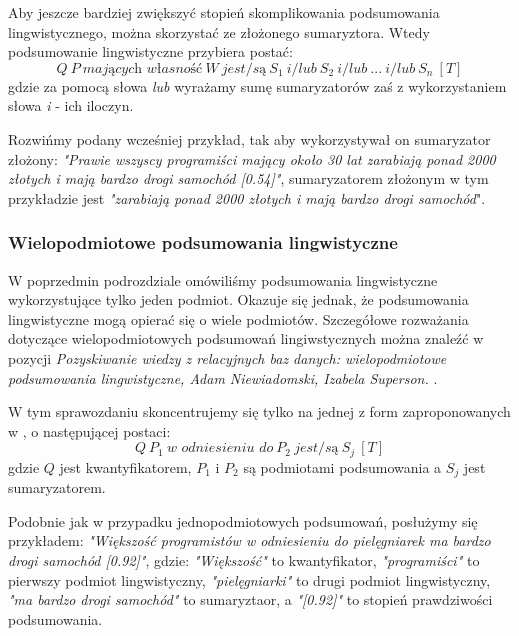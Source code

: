 \documentclass{classrep}
\begin{document}
Aby jeszcze bardziej zwiększyć stopień skomplikowania podsumowania lingwistycznego, można skorzystać ze złożonego sumaryztora. Wtedy podsumowanie lingwistyczne przybiera postać:
\begin{equation}
Q  ~ P ~ \textit{mających własność} ~ W ~ { \textit{jest/są} }  ~ S_1 ~ \textit{i/lub} ~ S_2  ~ \textit{i/lub} ~ ... ~ \textit{i/lub} ~ S_n ~[T]
\end{equation}
gdzie za pomocą słowa \textit{lub} wyrażamy sumę sumaryzatorów zaś z wykorzystaniem słowa \textit{i} - ich iloczyn.\newline

Rozwińmy podany wcześniej przykład, tak aby wykorzystywał on sumaryzator złożony: \textit{"Prawie wszyscy programiści mający około 30 lat zarabiają ponad 2000 złotych i mają bardzo drogi samochód [0.54]"}, sumaryzatorem złożonym w tym przykładzie jest \textit{"zarabiają ponad 2000 złotych i mają bardzo drogi samochód}".\newline


\subsubsection{Wielopodmiotowe podsumowania lingwistyczne}
W poprzedmin podrozdziale omówiliśmy podsumowania lingwistyczne wykorzystujące tylko jeden podmiot. Okazuje się jednak, że podsumowania lingwistyczne mogą opierać się o wiele podmiotów. Szczegółowe rozważania dotyczące wielopodmiotowych podsumowań lingiwstycznych można znaleźć w pozycji \textit{Pozyskiwanie wiedzy z relacyjnych baz danych: wielopodmiotowe podsumowania lingwistyczne, Adam Niewiadomski, Izabela Superson.} \cite{polska}. \newline

W tym sprawozdaniu skoncentrujemy się tylko na jednej z form zaproponowanych w \cite{polska}, o następującej postaci:
\begin{equation}
Q  ~ P_1 ~ \textit{w odniesieniu do} ~ P_2  ~ { \textit{jest/są} }  ~ S_j ~[T]
\end{equation}
gdzie $Q$ jest kwantyfikatorem, $P_1$ i $P_2$ są podmiotami podsumowania a $S_j$ jest sumaryzatorem.\newline

Podobnie jak w przypadku jednopodmiotowych podsumowań, posłużymy się przykładem: \textit{"Większość programistów w odniesieniu do pielęgniarek ma bardzo drogi samochód [0.92]"}, gdzie: \textit{"Większość"} to kwantyfikator, \textit{"programiści"} to pierwszy podmiot lingwistyczny,  \textit{"pielęgniarki"} to drugi podmiot lingwistyczny, \textit{"ma bardzo drogi samochód"} to sumaryztaor, a  \textit{"[0.92]"} to stopień prawdziwości podsumowania.
\end{document}

